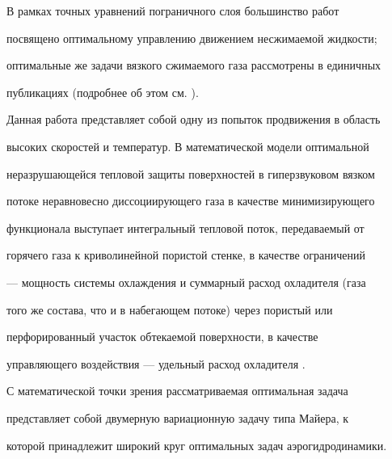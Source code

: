 \pagestyle{plain} %







\maketitle


\label{begin}





В рамках точных уравнений пограничного слоя большинство работ 


посвящено оптимальному управлению движением несжимаемой жидкости; 


оптимальные же задачи вязкого сжимаемого газа рассмотрены в единичных 


публикациях (подробнее об этом см. \cite{1}). 


 


Данная работа представляет собой одну из попыток продвижения в область 


высоких скоростей и температур. В математической модели оптимальной 


неразрушающейся тепловой защиты поверхностей в гиперзвуковом вязком 


потоке неравновесно диссоциирующего газа в качестве минимизирующего 


функционала выступает интегральный тепловой поток, передаваемый от 


горячего газа к криволинейной пористой стенке, в качестве ограничений 


--- мощность системы охлаждения и суммарный расход охладителя (газа 


того же состава, что и в набегающем потоке) через пористый или 


перфорированный участок обтекаемой поверхности, в качестве 


управляющего воздействия --- удельный расход охладителя \cite{2}. 


 


С математической точки зрения рассматриваемая оптимальная задача 


представляет собой двумерную вариационную задачу типа Майера, к 


которой принадлежит широкий круг оптимальных задач аэрогидродинамики. 


